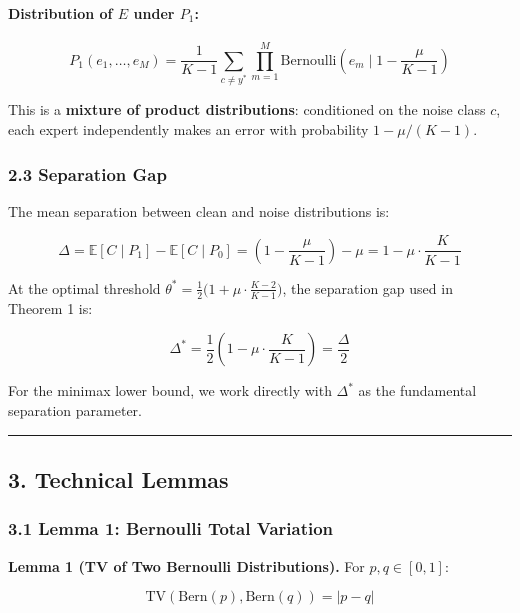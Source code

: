 \documentclass[
  12pt,
]{ctexart}
\begin{document}
\paragraph{\texorpdfstring{Distribution of \(E\) under
\(P_1\):}{Distribution of E under P\_1:}}\label{distribution-of-e-under-p_1}

\[P_1(e_1, \dots, e_M) = \frac{1}{K-1} \sum_{c \neq y^*} \prod_{m=1}^M \text{Bernoulli}\!\left(e_m \;\Big|\; 1 - \frac{\mu}{K-1}\right)\]

This is a \textbf{mixture of product distributions}: conditioned on the
noise class \(c\), each expert independently makes an error with
probability \(1 - \mu/(K-1)\).

\subsubsection{2.3 Separation Gap}\label{separation-gap}

The mean separation between clean and noise distributions is:

\[\Delta = \mathbb{E}[C \mid P_1] - \mathbb{E}[C \mid P_0]
      = \left(1 - \frac{\mu}{K-1}\right) - \mu
      = 1 - \mu \cdot \frac{K}{K-1}\]

At the optimal threshold
\(\theta^* = \frac{1}{2}\bigl(1 + \mu\cdot\frac{K-2}{K-1}\bigr)\), the
separation gap used in Theorem 1 is:

\[\Delta^* = \frac{1}{2}\left(1 - \mu \cdot \frac{K}{K-1}\right) = \frac{\Delta}{2}\]

For the minimax lower bound, we work directly with \(\Delta^*\) as the
fundamental separation parameter.

\begin{center}\rule{0.5\linewidth}{0.5pt}\end{center}

\subsection{3. Technical Lemmas}\label{technical-lemmas}

\subsubsection{3.1 Lemma 1: Bernoulli Total
Variation}\label{lemma-1-bernoulli-total-variation}

\textbf{Lemma 1 (TV of Two Bernoulli Distributions).} For
\(p, q \in [0,1]\):

\[\text{TV}(\text{Bern}(p), \text{Bern}(q)) = |p - q|\]
\end{document}

